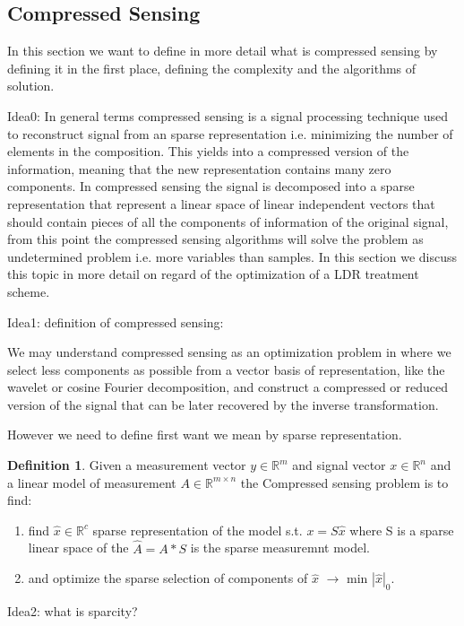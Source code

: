 \documentclass[12pt]{article}
\theoremstyle{definition}
\newtheorem{definition}{Definition}[section]
\begin{document}
\subsection{Compressed Sensing}
In this section we want to define in more detail what is compressed sensing by defining it in the first place, defining the complexity and the algorithms of solution.\par
Idea0: 
In general terms compressed sensing is a signal processing technique used to reconstruct signal from an sparse representation i.e. minimizing the number of elements in the composition. This yields into a compressed version of the information, meaning that the new representation contains many zero components. In compressed sensing the signal is decomposed into a sparse representation that represent a linear space of linear independent vectors that should contain pieces of all the components of information of the original signal, from this point the compressed sensing algorithms will solve the problem as undetermined problem i.e. more variables than samples. In this section we discuss this topic in more detail on regard of the optimization of a LDR treatment scheme. \par
Idea1: definition of compressed sensing:\par
We may understand compressed sensing as an optimization problem in where we select less components as possible from a vector basis of representation, like the wavelet or cosine Fourier decomposition, and construct a compressed or reduced version of the signal that can be later recovered by the inverse transformation. \par 
However we need to define first want we mean by sparse representation.
\theoremstyle{definition}
\begin{definition}
    Given a measurement vector $y\in\mathbb{R}^m$ and signal vector $x \in \mathbb{R}^n$ and a linear model of measurement $A \in \mathbb{R}^{m\times n}$ the Compressed sensing problem is to find:
    \begin{enumerate}
        \item find $\hat{x} \in \mathbb{R}^c$ sparse representation of the model s.t. $x = S \hat{x}$ where S is a sparse linear space of the $\hat{A} =  A*S$ is the sparse measuremnt model. 
        \item and optimize the sparse selection of components of $\hat{x}$ $\rightarrow$ min $|\hat{x}|_0$.
    \end{enumerate}
\end{definition}
Idea2: what is sparcity?
\end{document}
